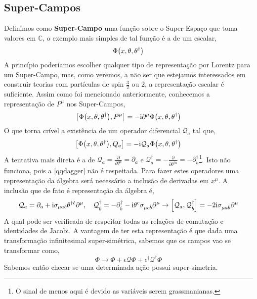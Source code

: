 \subsection{Super-Campos}Definimos como \textbf{Super-Campo} uma função sobre o Super-Espaço que toma valores em $\mathbb C$, o exemplo 
mais simples de tal função é a de um escalar,\[\Phi\qty(x,\theta,\theta^\dagger)\] A princípio poderíamos escolher 
qualquer tipo de representação por Lorentz para um Super-Campo, mas, como veremos, a não ser que estejamos interessados 
em construir teorias com partículas de spin $\frac32$ ou $2$, a representação escalar é suficiente. Assim como foi mencionado 
anteriormente, conhecemos a representação de $P^\mu$ nos Super-Campos,\[\comm{\Phi\qty(x,\theta,\theta^\dagger)}{P^\mu}=-\im\partial^\mu\Phi\qty(x,\theta,\theta^\dagger)\] O que torna crível a 
existência de um operador diferencial $\mathcal Q_a$ tal que,\[\comm{\Phi\qty(x,\theta,\theta^\dagger)}{Q_a}=-\im\mathcal Q_a\Phi\qty(x,\theta,\theta^\dagger)\] A tentativa mais direta é a de $\mathcal Q_a=\frac{\partial}{\partial\theta^a}=\partial_a$ e $\mathcal Q^\dagger_{\dot a}=-\frac{\partial}{\partial\theta^{\dagger\dot a}}=-\partial^\dagger_{\dot a}$\footnote{O 
sinal de menos aqui é devido as variáveis serem grassmanianas.}. Isto não funciona, pois a \cref{qqdagger} não é respeitada. Para fazer estes operadores 
uma representação da álgebra será necessário a inclusão de derivadas em $x^\mu$. A inclusão que de fato é representação da álgebra é,\[\mathcal Q_a=\partial_a+\im\sigma_{\mu a\dot c}\theta^{\dagger \dot c}\partial^\mu,\ \ \ \mathcal Q^\dagger_{\dot b}=-\partial^\dagger_{\dot b}-\im\theta^c\sigma_{\mu c\dot b}\partial^\mu\rightarrow \comm{\mathcal Q_a}{\mathcal Q^\dagger_{\dot b}}=-2\im\sigma_{\mu a\dot b}\partial^\mu\] A 
qual pode ser verificada de respeitar todas as relações de comutação e identidades de Jacobi. A vantagem de ter esta representação é que dada uma 
transformação infinitesimal super-simétrica, sabemos que os campos vao se transformar como,\[\Phi\rightarrow\Phi+\epsilon\mathcal Q\Phi+\epsilon^\dagger\mathcal Q^\dagger\Phi\] Sabemos então checar se uma 
determinada ação possui super-simetria.

